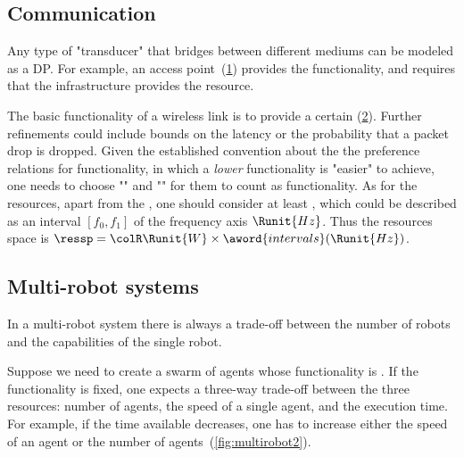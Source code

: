 
\subsection{Communication}

\begin{example}[Transducers]
  Any type of "transducer" that bridges between different
  mediums can be modeled as a DP. For example, an access point~(\cref{fig:accesspoint})
  provides the  functionality, and requires
  that the infrastructure provides the  resource.
\end{example}


\begin{figure}[h]
  \centering
  \caption{\label{fig:accesspoint}}
\end{figure}

\begin{example}
  The basic functionality of a wireless link is to provide
  a certain  (\cref{fig:networklink}). Further refinements could include bounds
  on the latency or the probability that a packet drop is dropped. Given
  the established convention about the the preference relations for
  functionality, in which a \emph{lower} functionality is "easier"
  to achieve, one needs to choose ""
  and "" for them
  to count as functionality. As for the resources, apart from the , one should consider at least ,
  which could be described as an interval $[f_0,f_1]$ of the frequency
  axis $\Runit{Hz}$. Thus the resources space is $\ressp=\colR\Runit{W}\times\aword{intervals}(\Runit{Hz})$.
\end{example}

\begin{figure}[h]
  \begin{center}
  \end{center}
  \caption{ \label{fig:networklink}}
\end{figure}

\subsection{Multi-robot systems}

In a multi-robot system there is always a trade-off between the number
of robots and the capabilities of the single robot.
\begin{example}
  Suppose we need to create a swarm of agents whose functionality is
  . If the functionality is fixed, one expects
  a three-way trade-off between the three resources: number of agents,
  the speed of a single agent, and the execution time. For example,
  if the time available decreases, one has to increase either the speed
  of an agent or the number of agents~(\cref{fig:multirobot2}).
\end{example}


